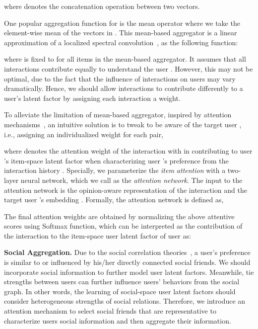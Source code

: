 \documentclass[sigconf]{acmart} \copyrightyear{2019}
\begin{document}
where  denotes the concatenation operation between two vectors.






One popular aggregation function for  is the mean operator where we take the element-wise mean of the vectors in . This mean-based aggregator is a linear approximation of a localized spectral convolution~\cite{kipf2017semi}, as the following function:

where  is fixed to  for all items in the mean-based aggregator. It assumes that all interactions contribute equally to understand the user . However, this may not be optimal, due to the fact that the influence of interactions on users may vary dramatically. Hence, we should allow interactions to contribute differently to a user's latent factor by assigning each interaction a weight.

To alleviate the limitation of mean-based aggregator, inspired by attention mechanisms~\cite{Chen2018Neural, yang2016hierarchical}, an intuitive solution is to tweak   to be aware of the target user , i.e., assigning an individualized weight for each  pair,

where  denotes the attention weight of the interaction with  in contributing to user 's item-space latent factor when characterizing user 's preference from the interaction history . Specially, we parameterize the \emph{item attention}  with a two-layer neural network, which we call as the \emph{attention network}.  The input to the attention network is the opinion-aware representation  of the interaction and the target user 's embedding . Formally, the attention network is defined as,


The final attention weights are obtained by normalizing the above attentive scores using Softmax function, which can be interpreted as the contribution of the interaction to the item-space user latent factor of user  as:


{\bf Social Aggregation.} Due to the social correlation theories~\cite{mcpherson2001birds,marsden1993network},  a user's preference is similar to or influenced by his/her directly connected social friends. We should incorporate social information to further model user latent factors.
Meanwhile, tie strengths between users can further influence users' behaviors from the social graph. In other words, the learning of social-space user latent factors should consider heterogeneous strengths of social relations. Therefore, we introduce an attention mechanism to select social friends that are representative to characterize users social information and then aggregate their information.
\end{document}

